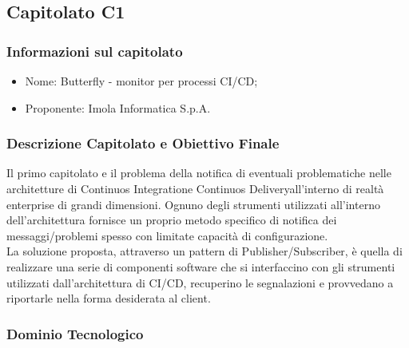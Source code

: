 \subsection{Capitolato C1}\label{C1}

\subsubsection{Informazioni sul capitolato}
\begin{itemize}
	\item Nome: Butterfly - monitor per processi CI/CD;
	\item Proponente: Imola Informatica S.p.A.
\end{itemize}

\subsubsection{Descrizione Capitolato e Obiettivo Finale}
Il primo capitolato e il problema della notifica di eventuali problematiche nelle architetture di Continuos Integration\glossario e Continuos Delivery\glossario all'interno di realtà enterprise di grandi dimensioni. Ognuno degli strumenti utilizzati all'interno dell'architettura fornisce un proprio metodo specifico di notifica dei messaggi/problemi spesso con limitate capacità di configurazione.\\
La soluzione proposta, attraverso un pattern di Publisher/Subscriber\glossario, è quella di realizzare una serie di componenti software che si interfaccino con gli strumenti utilizzati dall'architettura di CI/CD, recuperino  le segnalazioni e provvedano a riportarle nella forma desiderata al client.  
\subsubsection{Dominio Tecnologico}

